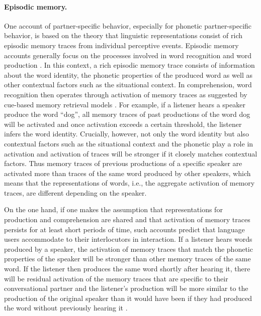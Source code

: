 \paragraph{Episodic memory.} One account of partner-specific behavior, especially for phonetic partner-specific behavior, is based
on the theory that linguistic representations consist of rich episodic memory traces from individual perceptive events. Episodic memory
accounts generally focus on the processes involved in word recognition and word production .
In this context, a rich episodic memory trace consists of information about the word identity, the phonetic properties of the produced word as well as other contextual factors
such as the situational context. In comprehension, word recognition then operates through
activation of memory traces as suggested by cue-based memory retrieval models . For example, if a listener hears a speaker produce 
the word ``dog'', all memory traces of past productions of the word
dog will be activated and once activation exceeds a certain threshold, the listener infers the word identity. Crucially, however, not only the word identity
but also contextual factors such as the situational context and the phonetic play a role in activation and activation of traces will be stronger if it closely matches
contextual factors. Thus memory traces of previous productions of a specific speaker are activated more than traces of the same word produced by other speakers,
which means that the representations of words, i.e., the aggregate activation of memory traces, are different depending on the speaker.

On the one hand, if one makes the assumption that representations for production and comprehension are shared and that activation of memory traces persists for at least
short periods of time, such accounts predict that language users
accommodate to their interlocutors in interaction. If a listener hears words produced by a speaker, the activation of memory traces that match the phonetic properties of the speaker
will be stronger than other memory traces of the same word. If the listener then produces the same word shortly after hearing it, there will be residual activation of the memory 
traces that are specific to their conversational partner and the listener's production will be more similar to the production of the original speaker than it would have been if they had
produced the word without previously hearing it \cite{Goldinger1998}.

